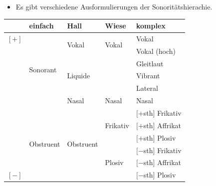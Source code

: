 \begin{frame}

\begin{itemize}
	\item Es gibt verschiedene Ausformulierungen der Sonoritätshierachie.

\end{itemize}

\begin{table}
\centering
\begin{tabular}{l|l|l|l|l} 
	 & einfach 				  	 & Hall 					  & \textbf{Wiese} 				& komplex  \\ 
\hline
\hline 
$[+]$& \multirow{6}{*}{Sonorant} & \multirow{2}{*}{Vokal} 	  & \multirow{2}{*}{Vokal} 		& Vokal  \\ 
	 & 							 & 						 	  &								& Vokal (hoch) \\
\cline{3-5}			
	 &							 & \multirow{3}{*}{Liquide}   &								& Gleitlaut \\
	 &						  	 &	 						  & \textipa{/\textscr /}		& Vibrant \\
\cline{4-5}			
	 &						 	 &							  & \textipa{/l/}				& Lateral \\
\cline{3-5}			
	 &							 & Nasal					  & Nasal						& Nasal \\
\hline			
	 &\multirow{6}{*}{Obstruent} & \multirow{6}{*}{Obstruent} & \multirow{3}{*}{Frikativ}	& $[+$sth$]$ Frikativ \\
	 &						 	 &							  &								& $[+$sth$]$ Affrikat \\		
	 &							 &							  &								& $[+$sth$]$ Plosiv \\
\cline{4-5}			
	 &						  	 &							  & \multirow{3}{*}{Plosiv}		& $[-$sth$]$ Frikativ \\
	 &						 	 &							  &								& $[-$sth$]$ Affrikat \\		
$[-]$&							 &							  &								& $[-$sth$]$ Plosiv \\
		
\end{tabular} 

\end{table}

\end{frame}




